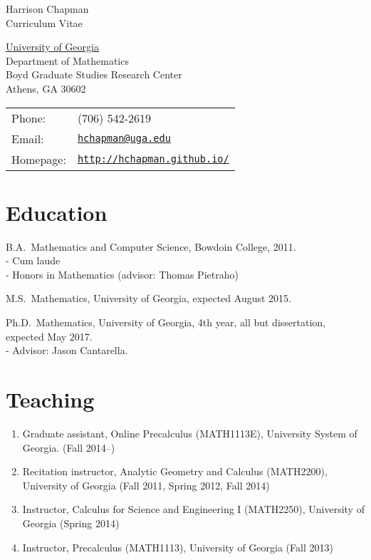 \documentclass[letterpaper]{article}
\def\name{Harrison Chapman}
\renewenvironment{itemize}{
  \begin{list}{}{
    \setlength{\leftmargin}{1.5em}
  }
}{
  \end{list}
}
\begin{document}
{\huge \name}\\
{\large\sc Curriculum Vitae}


\vspace{0.25in}

\begin{minipage}{0.45\linewidth}
  \href{http://www.uga.edu/}{University of Georgia} \\
  Department of Mathematics \\
  Boyd Graduate Studies Research Center \\
  Athens, GA 30602
\end{minipage}
\begin{minipage}{0.45\linewidth}
  \begin{tabular}{ll}
    Phone: & (706) 542-2619 \\
    Email: & \href{mailto:hchapman@uga.edu}{\tt hchapman@uga.edu} \\
    Homepage: & \href{http://hchapman.github.io/}{\tt http://hchapman.github.io/} \\
  \end{tabular}
\end{minipage}

\section*{Education}

\begin{itemize}
  \item B.A.\ Mathematics and Computer Science, Bowdoin College,
    2011.\\
    - \quad Cum laude \\
    - \quad Honors in Mathematics (advisor: Thomas Pietraho)
  \item M.S.\ Mathematics, University of Georgia, expected August 2015.
  \item Ph.D.\ Mathematics, University of Georgia, 4th year, all but dissertation, expected May
    2017.\\
   - \quad Advisor: Jason Cantarella.
\end{itemize}

\section*{Teaching}

\begin{enumerate}
\item Graduate assistant, Online
  Precalculus (MATH1113E), University System of Georgia. (Fall 2014--)
\item Recitation instructor, Analytic Geometry and Calculus
  (MATH2200), University of Georgia (Fall 2011, Spring 2012, Fall 2014)
\item Instructor, Calculus for Science and Engineering I (MATH2250), University of Georgia (Spring 2014)
\item Instructor, Precalculus (MATH1113), University of Georgia (Fall 2013)
\end{enumerate}
\end{document}
